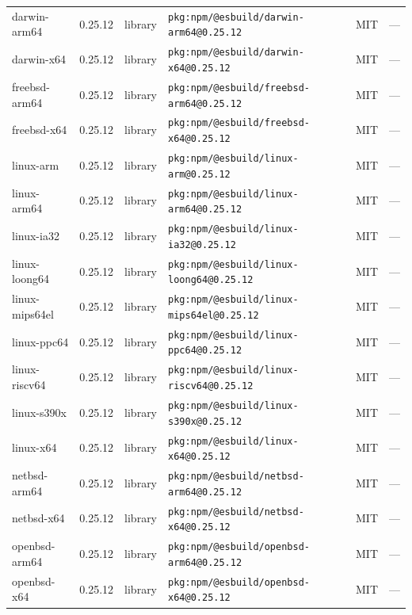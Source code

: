 \documentclass[11pt,a4paper]{article}
\begin{document}
\begin{longtable}{|p{4cm}|p{2cm}|p{1.6cm}|p{5cm}|p{1.5cm}|p{3.5cm}|}
\raggedright darwin-arm64 & 0.25.12 & library & \small\texttt{pkg:npm/@esbuild/darwin-arm64@0.25.12} & MIT & \small — \\
\raggedright darwin-x64 & 0.25.12 & library & \small\texttt{pkg:npm/@esbuild/darwin-x64@0.25.12} & MIT & \small — \\
\raggedright freebsd-arm64 & 0.25.12 & library & \small\texttt{pkg:npm/@esbuild/freebsd-arm64@0.25.12} & MIT & \small — \\
\raggedright freebsd-x64 & 0.25.12 & library & \small\texttt{pkg:npm/@esbuild/freebsd-x64@0.25.12} & MIT & \small — \\
\raggedright linux-arm & 0.25.12 & library & \small\texttt{pkg:npm/@esbuild/linux-arm@0.25.12} & MIT & \small — \\
\raggedright linux-arm64 & 0.25.12 & library & \small\texttt{pkg:npm/@esbuild/linux-arm64@0.25.12} & MIT & \small — \\
\raggedright linux-ia32 & 0.25.12 & library & \small\texttt{pkg:npm/@esbuild/linux-ia32@0.25.12} & MIT & \small — \\
\raggedright linux-loong64 & 0.25.12 & library & \small\texttt{pkg:npm/@esbuild/linux-loong64@0.25.12} & MIT & \small — \\
\raggedright linux-mips64el & 0.25.12 & library & \small\texttt{pkg:npm/@esbuild/linux-mips64el@0.25.12} & MIT & \small — \\
\raggedright linux-ppc64 & 0.25.12 & library & \small\texttt{pkg:npm/@esbuild/linux-ppc64@0.25.12} & MIT & \small — \\
\raggedright linux-riscv64 & 0.25.12 & library & \small\texttt{pkg:npm/@esbuild/linux-riscv64@0.25.12} & MIT & \small — \\
\raggedright linux-s390x & 0.25.12 & library & \small\texttt{pkg:npm/@esbuild/linux-s390x@0.25.12} & MIT & \small — \\
\raggedright linux-x64 & 0.25.12 & library & \small\texttt{pkg:npm/@esbuild/linux-x64@0.25.12} & MIT & \small — \\
\raggedright netbsd-arm64 & 0.25.12 & library & \small\texttt{pkg:npm/@esbuild/netbsd-arm64@0.25.12} & MIT & \small — \\
\raggedright netbsd-x64 & 0.25.12 & library & \small\texttt{pkg:npm/@esbuild/netbsd-x64@0.25.12} & MIT & \small — \\
\raggedright openbsd-arm64 & 0.25.12 & library & \small\texttt{pkg:npm/@esbuild/openbsd-arm64@0.25.12} & MIT & \small — \\
\raggedright openbsd-x64 & 0.25.12 & library & \small\texttt{pkg:npm/@esbuild/openbsd-x64@0.25.12} & MIT & \small — \\

\end{longtable}
\end{document}
